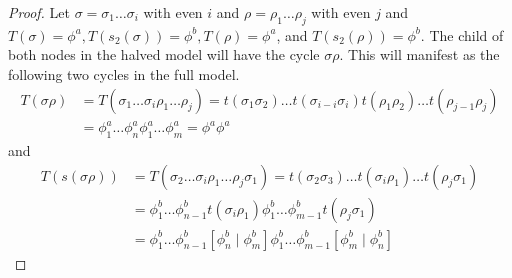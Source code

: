 \begin{proof}
	Let $\sigma = \sigma_1 \dots \sigma_i$ with even $i$ and $\rho = \rho_1 \dots \rho_j$ with even $j$ and $T(\sigma) = \phi^a, T(s_2(\sigma)) = \phi^b, T(\rho) = \phi^a$, and $T(s_2(\rho)) = \phi^b$.
	The child of both nodes in the halved model will have the cycle $\sigma\rho$.
	This will manifest as the following two cycles in the full model.
	\begin{align*}
		T(\sigma\rho) & = T(\sigma_1 \dots \sigma_i \rho_1 \dots \rho_j) = t(\sigma_1\sigma_2) \dots t(\sigma_{i-i}\sigma_i) t(\rho_1\rho_2) \dots t(\rho_{j-1}\rho_j) \\
		              & = \phi^a_1 \dots \phi^a_n \phi^a_1 \dots \phi^a_m = \phi^a\phi^a
	\end{align*}
	and
	\begin{align*}
		T(s(\sigma\rho)) & = T(\sigma_2 \dots \sigma_i \rho_1 \dots \rho_j \sigma_1) = t(\sigma_2\sigma_3) \dots t(\sigma_i\rho_1) \dots t(\rho_j\sigma_1)   \\
		                 & = \phi^b_1 \dots \phi^b_{n-1} t(\sigma_i\rho_1) \phi^b_1 \dots \phi^b_{m-1} t(\rho_j\sigma_1)                                     \\
		                 & = \phi^b_1 \dots \phi^b_{n-1} \left[\phi^b_n \mid \phi^b_m\right] \phi^b_1 \dots \phi^b_{m-1} \left[\phi^b_m \mid \phi^b_n\right]
	\end{align*}
\end{proof}
